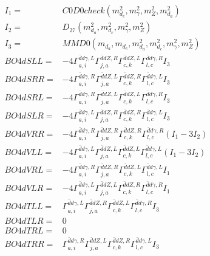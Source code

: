 \documentclass[A4,landscape]{article}
\begin{document}
\begin{align} 
I_1 = & C0D0check(m^2_{d_{{c}}}, m^2_{\gamma}, m^2_{Z}, m^2_{d_{{a}}}) \\ 
I_2 = & D_{27}(m^2_{d_{{a}}}, m^2_{d_{{c}}}, m^2_{\gamma}, m^2_{Z}) \\ 
I_3 = & MMD0(m_{d_{{a}}}, m_{d_{{c}}}, m^2_{d_{{a}}}, m^2_{d_{{c}}}, m^2_{\gamma}, m^2_{Z}) \\ 
  BO4dSLL= & -4  \Gamma^{\bar{d}d \gamma ,L}_{a, i} \Gamma^{\bar{d}d Z ,R}_{j, a} \Gamma^{\bar{d}d Z ,L}_{c, k} \Gamma^{\bar{d}d \gamma ,R}_{l, c} I_3 \\ 
  BO4dSRR= & -4  \Gamma^{\bar{d}d \gamma ,R}_{a, i} \Gamma^{\bar{d}d Z ,L}_{j, a} \Gamma^{\bar{d}d Z ,R}_{c, k} \Gamma^{\bar{d}d \gamma ,L}_{l, c} I_3 \\ 
  BO4dSRL= & -4  \Gamma^{\bar{d}d \gamma ,R}_{a, i} \Gamma^{\bar{d}d Z ,L}_{j, a} \Gamma^{\bar{d}d Z ,L}_{c, k} \Gamma^{\bar{d}d \gamma ,R}_{l, c} I_3 \\ 
  BO4dSLR= & -4  \Gamma^{\bar{d}d \gamma ,L}_{a, i} \Gamma^{\bar{d}d Z ,R}_{j, a} \Gamma^{\bar{d}d Z ,R}_{c, k} \Gamma^{\bar{d}d \gamma ,L}_{l, c} I_3 \\ 
  BO4dVRR= & -4  \Gamma^{\bar{d}d \gamma ,R}_{a, i} \Gamma^{\bar{d}d Z ,R}_{j, a} \Gamma^{\bar{d}d Z ,R}_{c, k} \Gamma^{\bar{d}d \gamma ,R}_{l, c} (I_1 - 3 I_2) \\ 
  BO4dVLL= & -4  \Gamma^{\bar{d}d \gamma ,L}_{a, i} \Gamma^{\bar{d}d Z ,L}_{j, a} \Gamma^{\bar{d}d Z ,L}_{c, k} \Gamma^{\bar{d}d \gamma ,L}_{l, c} (I_1 - 3 I_2) \\ 
  BO4dVRL= & -4  \Gamma^{\bar{d}d \gamma ,R}_{a, i} \Gamma^{\bar{d}d Z ,R}_{j, a} \Gamma^{\bar{d}d Z ,L}_{c, k} \Gamma^{\bar{d}d \gamma ,L}_{l, c} I_1 \\ 
  BO4dVLR= & -4  \Gamma^{\bar{d}d \gamma ,L}_{a, i} \Gamma^{\bar{d}d Z ,L}_{j, a} \Gamma^{\bar{d}d Z ,R}_{c, k} \Gamma^{\bar{d}d \gamma ,R}_{l, c} I_1 \\ 
  BO4dTLL= &  \Gamma^{\bar{d}d \gamma ,L}_{a, i} \Gamma^{\bar{d}d Z ,R}_{j, a} \Gamma^{\bar{d}d Z ,L}_{c, k} \Gamma^{\bar{d}d \gamma ,R}_{l, c} I_3 \\ 
  BO4dTLR= & 0 \\ 
  BO4dTRL= & 0 \\ 
  BO4dTRR= &  \Gamma^{\bar{d}d \gamma ,R}_{a, i} \Gamma^{\bar{d}d Z ,L}_{j, a} \Gamma^{\bar{d}d Z ,R}_{c, k} \Gamma^{\bar{d}d \gamma ,L}_{l, c} I_3 \\ 
\end{align} 
\end{document}
